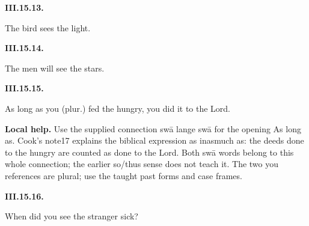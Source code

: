 \par\begin{minipage}{\linewidth}\raggedright
\textbf{III.15.13.}

The bird sees the light.

\end{minipage}\par\addvspace{4pt}

\par\begin{minipage}{\linewidth}\raggedright
\textbf{III.15.14.}

The men will see the stars.

\end{minipage}\par\addvspace{4pt}

\par\begin{minipage}{\linewidth}\raggedright
\textbf{III.15.15.}

As long as you (plur.) fed the hungry, you did it to the Lord.

\end{minipage}\par\addvspace{4pt}

\textbf{Local help.} Use the supplied connection swā lange swā for the opening As long as. Cook’s note17 explains the biblical expression as inasmuch as: the deeds done to the hungry are counted as done to the Lord. Both swā words belong to this whole connection; the earlier so/\allowbreak{}thus sense does not teach it. The two you references are plural; use the taught past forms and case frames.

\par\begin{minipage}{\linewidth}\raggedright
\textbf{III.15.16.}

When did you see the stranger sick?

\end{minipage}\par\addvspace{4pt}

